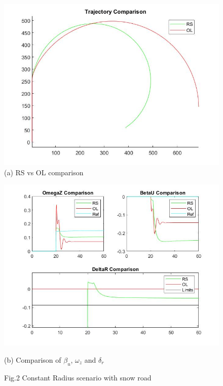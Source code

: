 \begin{figure}[!h]
		\centering
	        \includegraphics[scale=0.4]{./Images/ConstRSnow/t} 
                \caption{(a)  RS vs OL comparison}
          
	\end{figure}

\begin{figure}[!h]
		\centering
	        \includegraphics[scale=0.6]{./Images/ConstRSnow/s} 
                \caption{(b) Comparison of  $\beta_{u}$, $\omega_{z}$ and $\delta_{r}$}
                \caption{Fig.2 Constant Radius scenario with snow road}
               
	\end{figure}

